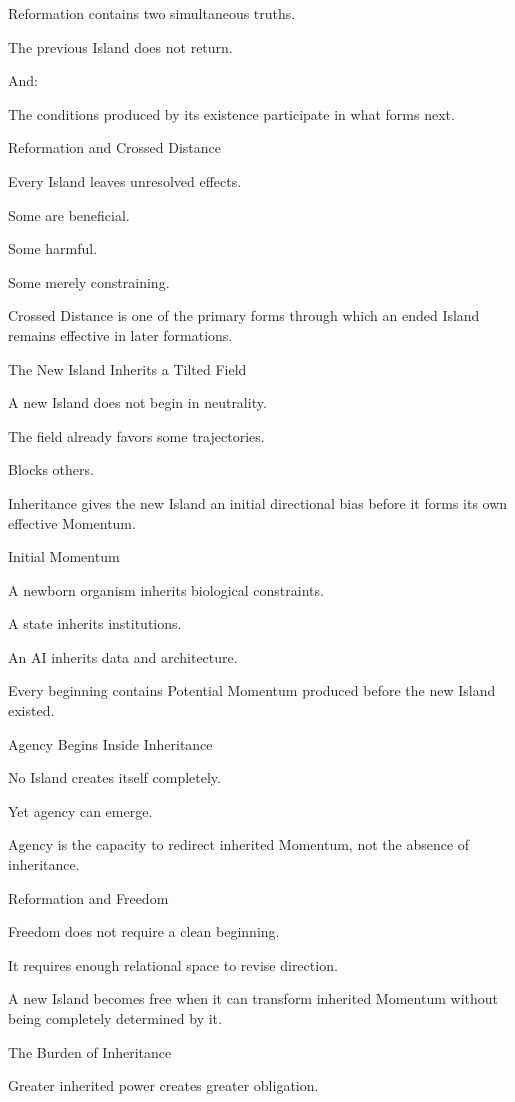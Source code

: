 Reformation contains two simultaneous truths.

The previous Island does not return.

And:

The conditions produced by its existence participate in what forms next.

Reformation and Crossed Distance

Every Island leaves unresolved effects.

Some are beneficial.

Some harmful.

Some merely constraining.

Crossed Distance is one of the primary forms through which an ended Island remains effective in later formations.

The New Island Inherits a Tilted Field

A new Island does not begin in neutrality.

The field already favors some trajectories.

Blocks others.

Inheritance gives the new Island an initial directional bias before it forms its own effective Momentum.

Initial Momentum

A newborn organism inherits biological constraints.

A state inherits institutions.

An AI inherits data and architecture.

Every beginning contains Potential Momentum produced before the new Island existed.

Agency Begins Inside Inheritance

No Island creates itself completely.

Yet agency can emerge.

Agency is the capacity to redirect inherited Momentum, not the absence of inheritance.

Reformation and Freedom

Freedom does not require a clean beginning.

It requires enough relational space to revise direction.

A new Island becomes free when it can transform inherited Momentum without being completely determined by it.

The Burden of Inheritance

Greater inherited power creates greater obligation.

